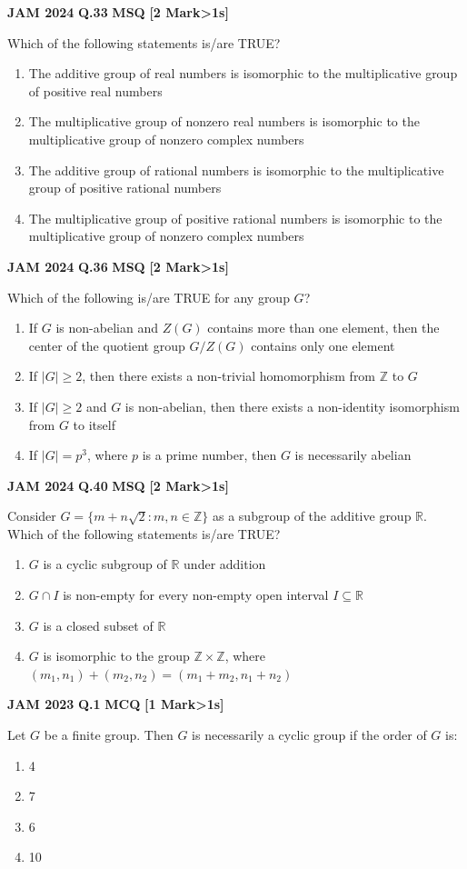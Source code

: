 \documentclass[11pt,a4paper]{article}
\newcommand{\pyqheader}[4]{%
    \noindent\begin{tcolorbox}[
        colback=badgebg,
        colframe=secondary,
        arc=2mm,
        boxrule=0.6pt,
        top=1.5mm,bottom=1.5mm,left=2mm,right=2mm
    ]
        \textbf{\textcolor{primary}{JAM #1}} \hfill \textbf{Q.#2} \hfill \textsc{\textbf{#3}} \hfill \textbf{[#4 Mark\ifnum#4>1s\fi]}
    \end{tcolorbox}\vspace{-1mm}
}
\begin{document}
\pyqheader{2024}{33}{MSQ}{2}
Which of the following statements is/are TRUE?
\begin{enumerate}[label=(\Alph*)]
    \item The additive group of real numbers is isomorphic to the multiplicative group of positive real numbers
    \item The multiplicative group of nonzero real numbers is isomorphic to the multiplicative group of nonzero complex numbers
    \item The additive group of rational numbers is isomorphic to the multiplicative group of positive rational numbers
    \item The multiplicative group of positive rational numbers is isomorphic to the multiplicative group of nonzero complex numbers
\end{enumerate}

\pyqheader{2024}{36}{MSQ}{2}
Which of the following is/are TRUE for any group $G$?
\begin{enumerate}[label=(\Alph*)]
    \item If $G$ is non-abelian and $Z(G)$ contains more than one element, then the center of the quotient group $G/Z(G)$ contains only one element
    \item If $|G|\ge 2$, then there exists a non-trivial homomorphism from $\mathbb{Z}$ to $G$
    \item If $|G|\ge 2$ and $G$ is non-abelian, then there exists a non-identity isomorphism from $G$ to itself
    \item If $|G|=p^3$, where $p$ is a prime number, then $G$ is necessarily abelian
\end{enumerate}

\pyqheader{2024}{40}{MSQ}{2}
Consider $G=\{m+n\sqrt{2}: m,n\in\mathbb{Z}\}$ as a subgroup of the additive group $\mathbb{R}$. Which of the following statements is/are TRUE?
\begin{enumerate}[label=(\Alph*)]
    \item $G$ is a cyclic subgroup of $\mathbb{R}$ under addition
    \item $G\cap I$ is non-empty for every non-empty open interval $I\subseteq\mathbb{R}$
    \item $G$ is a closed subset of $\mathbb{R}$
    \item $G$ is isomorphic to the group $\mathbb{Z}\times\mathbb{Z}$, where $(m_1,n_1)+(m_2,n_2)=(m_1+m_2, n_1+n_2)$
\end{enumerate}

\pyqheader{2023}{1}{MCQ}{1}
Let $G$ be a finite group. Then $G$ is necessarily a cyclic group if the order of $G$ is:
\begin{enumerate}[label=(\Alph*)]
    \item 4
    \item 7
    \item 6
    \item 10
\end{enumerate}
\end{document}
